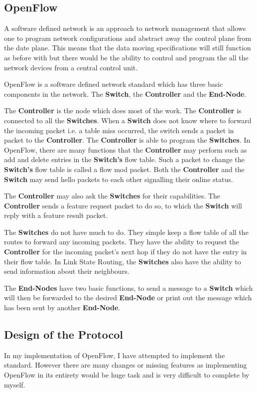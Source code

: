 \documentclass{article}
\begin{document}
\subsection{OpenFlow}
A software defined network is an approach to network management that allows one
to program network configurations and abstract away the control plane from the
date plane. This means that the data moving specifications will still function
as before with but there would be the ability to control and program the all the
network devices from a central control unit.

OpenFlow is a software defined network standard which has three basic components
in the network. The \textbf{Switch}, the \textbf{Controller} and the
\textbf{End-Node}.

The \textbf{Controller} is the node which does most of the work. The
\textbf{Controller} is connected to all the \textbf{Switches}. When a
\textbf{Switch} does not know where to forward the incoming packet i.e. a table
miss occurred, the switch sends a packet in packet to the \textbf{Controller}.
The \textbf{Controller} is able to program the \textbf{Switches}. In OpenFlow,
there are many functions that the \textbf{Controller} may perform such as
add and delete entries in the \textbf{Switch's} flow table. Such a packet to
change the \textbf{Switch's} flow table is called a flow mod packet. Both the
\textbf{Controller} and the \textbf{Switch} may send hello packets to each other
signalling their online status.

The \textbf{Controller} may also ask the \textbf{Switches} for their
capabilities. The \textbf{Controller} sends a feature request packet to do so,
to which the \textbf{Switch} will reply with a feature result packet.

The \textbf{Switches} do not have much to do. They simple keep a flow table of
all the routes to forward any incoming packets. They have the ability to request
the \textbf{Controller} for the incoming packet's next hop if they do not have
the entry in their flow table. In Link State Routing, the \textbf{Switches} also
have the ability to send information about their neighbours.

The \textbf{End-Nodes} have two basic functions, to send a message to a
\textbf{Switch} which will then be forwarded to the desired \textbf{End-Node} or
print out the message which has been sent by another \textbf{End-Node}.

\subsection{Design of the Protocol}
In my implementation of OpenFlow, I have attempted to implement the standard.
However there are many changes or missing features as implementing OpenFlow in
its entirety would be huge task and is very difficult to complete by myself.
\end{document}
